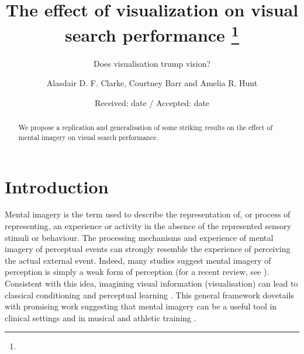 \documentclass[smallextended]{svjour3}       %
\begin{document}
\title{The effect of visualization on visual search performance
\thanks{}}

\subtitle{Does visualisation trump vision?}


\author{Alasdair D. F. Clarke, Courtney Barr  and  Amelia R. Hunt
}



\date{Received: date / Accepted: date}


\maketitle

\begin{abstract}
We propose a replication and generalisation of some striking results on the effect of mental imagery on visual search performance. 
\end{abstract}

\section{Introduction}
\label{sec:intro}

Mental imagery is the term used to describe the representation of, or process of representing, an experience or activity in the absence of the represented sensory stimuli or behaviour. The processing mechanisms and experience of mental imagery of perceptual events can strongly resemble the experience of perceiving the actual external event. Indeed, many studies suggest mental imagery of perception is simply a weak form of perception (for a recent review, see \cite{pearson2015}). Consistent with this idea, imagining visual information (visualisation) can lead to classical conditioning \citep{lewis2013} and perceptual learning \citep{tartaglia2009}. This general framework dovetails with promising work suggesting that mental imagery can be a useful tool in clinical settings \citep[e.g.][]{foa1980} and in musical and athletic training \citep[e.g.][]{zatorre2007, guillot2008}. 
\end{document}
